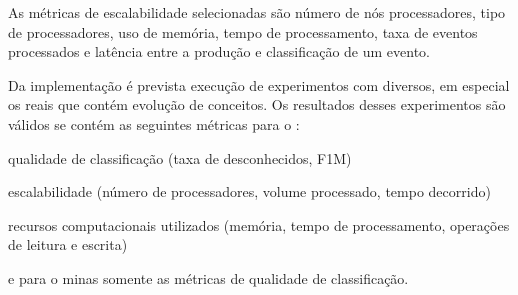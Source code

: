 


As métricas de escalabilidade selecionadas são número de nós processadores, tipo
de processadores, uso de memória, tempo de processamento, taxa de eventos
processados e latência entre a produção e classificação de um evento.

Da implementação \mfog é prevista execução de experimentos com \datasets
diversos, em especial os \datasets reais que contém evolução de conceitos.
Os resultados desses experimentos são válidos se contém as seguintes métricas
para o \mfog: \begin{enumerate*}[label={\alph*)}]
  \item qualidade de classificação (taxa de desconhecidos, F1M)
  \item escalabilidade (número de processadores, volume processado, tempo decorrido)
  \item recursos computacionais utilizados (memória, tempo de processamento, operações de leitura e escrita)
\end{enumerate*}
e para o minas somente as métricas de qualidade de classificação.


